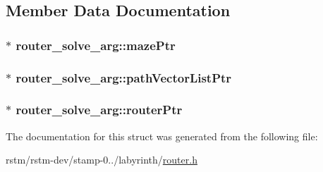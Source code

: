 \subsection{Member Data Documentation}
\hypertarget{structrouter__solve__arg_a04601317b05ce293c55299b51c3d6db4}{
\subsubsection[{maze\-Ptr}]{$\ast$ router\-\_\-solve\-\_\-arg\-::maze\-Ptr}}\label{structrouter__solve__arg_a04601317b05ce293c55299b51c3d6db4}
\hypertarget{structrouter__solve__arg_add676eeff9cb2e5be2f617c8c4e38524}{
\subsubsection[{path\-Vector\-List\-Ptr}]{$\ast$ router\-\_\-solve\-\_\-arg\-::path\-Vector\-List\-Ptr}}\label{structrouter__solve__arg_add676eeff9cb2e5be2f617c8c4e38524}
\hypertarget{structrouter__solve__arg_a8d92e62810830f105c1aed9a07d1b871}{
\subsubsection[{router\-Ptr}]{$\ast$ router\-\_\-solve\-\_\-arg\-::router\-Ptr}}\label{structrouter__solve__arg_a8d92e62810830f105c1aed9a07d1b871}


The documentation for this struct was generated from the following file\-:\begin{DoxyCompactItemize}
\item 
rstm/rstm-\/dev/stamp-\/0../labyrinth/\hyperlink{router_8h}{router.\-h}\end{DoxyCompactItemize}
